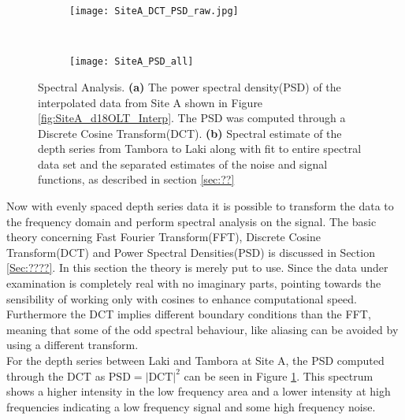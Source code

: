 \documentclass[../../CompleteThesis/Complete_1stDraft.tex]{subfiles}
\begin{document}
	\begin{figure}[h]
		\centering
		\begin{subfigure}{.45\textwidth}
			\centering
			\texttt{[image: SiteA\_DCT\_PSD\_raw.jpg]}
			\caption[PSD of LT data, Site A]{}
			\label{fig:SiteA_DCT_PSD_raw}
		\end{subfigure}
		~
		\begin{subfigure}{0.45\textwidth}
			\texttt{[image: SiteA\_PSD\_all]}
			\caption[Spectral fit, Site A]{}%
			\label{fig:SiteA_SpectralFitsAll}
		\end{subfigure}
		\caption[Spectral Analysis]{Spectral Analysis. \textbf{(a)} The power spectral density(PSD) of the interpolated data from Site A shown in Figure \ref{fig:SiteA_d18OLT_Interp}. The PSD was computed through a Discrete Cosine Transform(DCT). \textbf{(b)} Spectral estimate of the depth series from Tambora to Laki along with fit to entire spectral data set and the separated estimates of the noise and signal functions, as described in section \ref{sec:??}}
		\label{fig:SiteA_SpectralAnalysis}
	\end{figure}
	Now with evenly spaced depth series data it is possible to transform the data to the frequency domain and perform spectral analysis on the signal. The basic theory concerning Fast Fourier Transform(FFT), Discrete Cosine Transform(DCT) and Power Spectral Densities(PSD) is discussed in Section \ref{Sec:????}. In this section the theory is merely put to use. Since the data under examination is completely real with no imaginary parts, pointing towards the sensibility of working only with cosines to enhance computational speed. Furthermore the DCT implies different boundary conditions than the FFT, meaning that some of the odd spectral behaviour, like aliasing can be avoided by using a different transform.\\
	For the depth series between Laki and Tambora at Site A, the PSD computed through the DCT as $\text{PSD} = |\text{DCT}|^2$ can be seen in Figure \ref{fig:SiteA_DCT_PSD_raw}. This spectrum shows a higher intensity in the low frequency area and a lower intensity at high frequencies indicating a low frequency signal and some high frequency noise.
	
	
	
\end{document}
